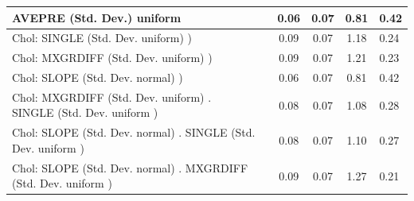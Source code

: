 \begin{table}
\begin{center}
\begin{tabular}{|l|l|c|c|c|l|}
			\hline
			AVEPRE (Std. Dev.) uniform &  & 0.06 & 0.07 & 0.81 & 0.42 \\
			\hline
			 Chol: SINGLE (Std. Dev. uniform) ) &  & 0.09 & 0.07 & 1.18 & 0.24 \\
			\hline
			 Chol: MXGRDIFF (Std. Dev. uniform) ) &  & 0.09 & 0.07 & 1.21 & 0.23 \\
			\hline
			 Chol: SLOPE (Std. Dev. normal) ) &  & 0.06 & 0.07 & 0.81 & 0.42 \\
			\hline
			 Chol: MXGRDIFF (Std. Dev. uniform) . SINGLE (Std. Dev.   uniform ) &  & 0.08 & 0.07 & 1.08 & 0.28 \\
			\hline
			 Chol: SLOPE (Std. Dev. normal) . SINGLE (Std. Dev.   uniform ) &  & 0.08 & 0.07 & 1.10 & 0.27 \\
			\hline
			 Chol: SLOPE (Std. Dev. normal) . MXGRDIFF (Std. Dev.   uniform ) &  & 0.09 & 0.07 & 1.27 & 0.21 \\
			\hline
		\end{tabular}
	\end{center}
\end{table}